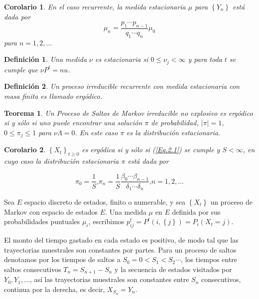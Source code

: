 \documentclass{article}
\newtheorem{Def}{Definición}
\newtheorem{Teo}{Teorema}
\newtheorem{Cor}{Corolario}
\begin{document}
\begin{Cor}\label{Corolario2.3}
En el caso recurrente, la medida estacionaria $\mu$ para
$\left\{Y_{n}\right\}$ est\'a dada por
\begin{equation}\label{Eq.2.3}
\mu_{n}=\frac{p_{1}\cdots p_{n-1}}{q_{1}\cdots q_{n}}\mu_{0}
\end{equation}
para $n=1,2,\ldots$
\end{Cor}

\begin{Def}
Una medida $\nu$ es estacionaria si $0\leq\nu_{j}<\infty$ y para toda $t$ se cumple que $\nu P^{t}=nu$.
\end{Def}


\begin{Def}
Un proceso irreducible recurrente con medida estacionaria con masa finita es llamado erg\'odico.
\end{Def}

\begin{Teo}\label{Teo4.3}
Un Proceso de Saltos de Markov irreducible no explosivo es erg\'odico si y s\'olo si uno puede encontrar una soluci\'on $\pi$ de probabilidad, $|\pi|=1$, $0\leq\pi_{j}\leq1$ para $\nu\Lambda=0$. En este caso $\pi$ es la distribuci\'on estacionaria.
\end{Teo}
\begin{Cor}\label{Corolario2.4}
$\left\{X_{t}\right\}_{t\geq0}$ es erg\'odica si y s\'olo si (\ref{Eq.2.1}) se cumple y $S<\infty$, en cuyo caso la distribuci\'on estacionaria $\pi$ est\'a dada por

\begin{equation}\label{Eq.2.4}
\pi_{0}=\frac{1}{S}\textrm{,
}\pi_{n}=\frac{1}{S}\frac{\beta_{0}\cdots\beta_{n-1}}{\delta_{1}\cdots\delta_{n}}\textrm{,
}n=1,2,\ldots
\end{equation}
\end{Cor}


Sea $E$ espacio discreto de estados, finito o numerable, y sea $\left\{X_{t}\right\}$ un proceso de Markov con espacio de estados $E$. Una medida $\mu$ en $E$ definida por sus probabilidades puntuales $\mu_{i}$, escribimos $p_{ij}^{t}=P^{t}\left(i,\left\{j\right\}\right)=P_{i}\left(X_{t}=j\right)$.

El monto del tiempo gastado en cada estado es positivo, de modo tal que las trayectorias muestrales son constantes por partes. Para un proceso de saltos denotamos por los tiempos de saltos a $S_{0}=0<S_{1}<S_{2}\cdots$, los tiempos entre saltos consecutivos $T_{n}=S_{n+1}-S_{n}$ y la secuencia de estados visitados por $Y_{0},Y_{1},\ldots$, as\'i las trayectorias muestrales son constantes entre $S_{n}$ consecutivos, continua por la derecha, es decir, $X_{S_{n}}=Y_{n}$. 
\end{document}
